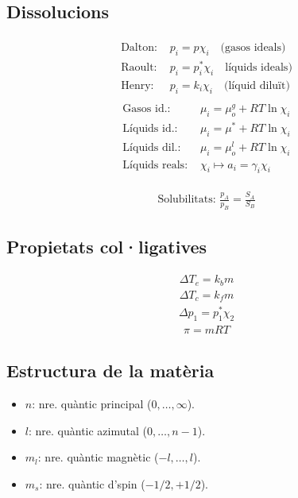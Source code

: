 \subsection{Dissolucions}
\begin{align}
    \begin{aligned}
        \text{Dalton: } & p_{i} = p \chi_{i} \quad \text{(gasos ideals)} \\
        \text{Raoult: } & p_{i} = p_{i}^{\ast} \chi_{i} \quad \text{líquids ideals)} \\
        \text{Henry: } & p_{i} = k_{i} \chi_{i} \quad \text{(líquid diluït)}
    \end{aligned}
\end{align}
\begin{align}
    \begin{aligned}
        \text{Gasos id.: } & \mu_{i} = \mu_{o}^{g} + RT \ln \chi_{i} \\
        \text{Líquids id.: } & \mu_{i} = \mu^{\ast} + RT \ln \chi_{i} \\
        \text{Líquids dil.: } & \mu_{i} = \mu_{o}^{l} + RT \ln \chi_{i} \\
        \text{Líquids reals: } & \chi_{i} \mapsto a_{i} = \gamma_{i} \chi_{i}
    \end{aligned}
\end{align}

\begin{align}
    \text{Solubilitats: } \frac{p_A}{p_B} = \frac{S_A}{S_B}
\end{align}
\subsection{Propietats col·ligatives}
\begin{align}
    \Delta T_e = k_b m
\end{align}
\begin{align}
    \Delta T_c = k_f m
\end{align}
\begin{align}
    \Delta p_1 = p_1^{\ast} \chi_2
\end{align}
\begin{align}
    \pi = mRT
\end{align}
\subsection{Estructura de la matèria}
\begin{itemize}
    \item $n$: nre. quàntic principal ($0, \dots, \infty$).
    \item $l$: nre. quàntic azimutal ($0, \dots, n-1$).
    \item $m_l$: nre. quàntic magnètic ($-l, \dots, l$).
    \item $m_s$: nre. quàntic d'spin ($-1/2, +1/2$).
\end{itemize}

